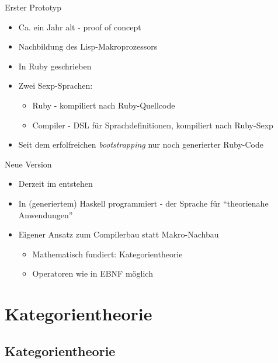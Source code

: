 \documentclass{beamer}
\begin{document}
\begin{frame}{Erster Prototyp}
  \begin{itemize}
  \item Ca. ein Jahr alt - proof of concept
  \item Nachbildung des Lisp-Makroprozessors
  \item In Ruby geschrieben
  \item Zwei Sexp-Sprachen:
    \begin{itemize}
    \item Ruby - kompiliert nach Ruby-Quellcode
    \item Compiler - DSL für Sprachdefinitionen, kompiliert nach Ruby-Sexp
    \end{itemize}
  \item Seit dem erfolfreichen \textit{bootstrapping} nur noch
    generierter Ruby-Code
  \end{itemize}
\end{frame}

\begin{frame}{Neue Version}
  \begin{itemize}
  \item Derzeit im entstehen
  \item In (generiertem) Haskell programmiert - der Sprache für ``theorienahe Anwendungen''
  \item Eigener Ansatz zum Compilerbau statt Makro-Nachbau
    \begin{itemize}
    \item Mathematisch fundiert: Kategorientheorie
    \item Operatoren wie in EBNF möglich
    \end{itemize}  
  \end{itemize}
\end{frame}

\section{Kategorientheorie}
\subsection{Kategorientheorie}
\end{document}
